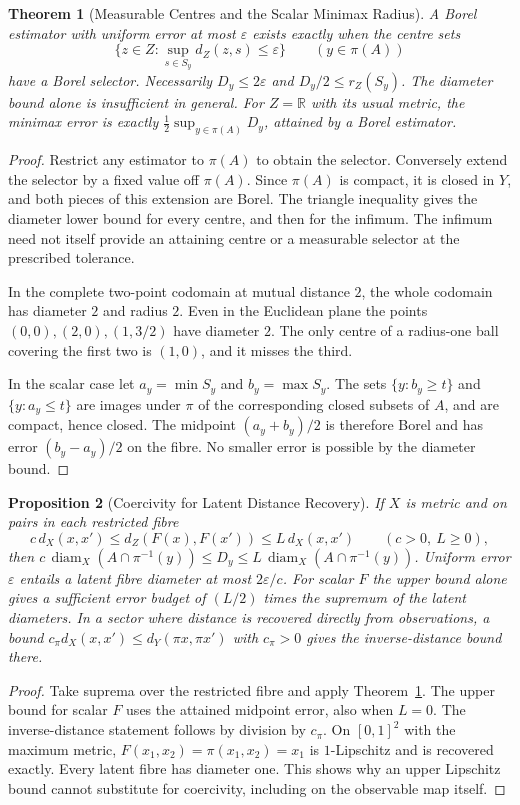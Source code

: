 \documentclass[11pt,a4paper]{article}
\newtheorem{theorem}{Theorem}[section]
\newtheorem{proposition}[theorem]{Proposition}
\theoremstyle{definition}
\begin{document}
\begin{theorem}[Measurable Centres and the Scalar Minimax Radius]\label{thm:measurable-fibre-centres}
A Borel estimator with uniform error at most $\varepsilon$ exists exactly when the centre sets
\[
 \{z\in Z:\sup_{s\in S_y}d_Z(z,s)\le\varepsilon\}
 \qquad (y\in\pi(A))
\]
have a Borel selector. Necessarily $D_y\le2\varepsilon$ and $D_y/2\le r_Z(S_y)$. The diameter bound alone is insufficient in general. For $Z=\mathbb R$ with its usual metric, the minimax error is exactly $\tfrac12\sup_{y\in\pi(A)}D_y$, attained by a Borel estimator.
\end{theorem}
\begin{proof}
Restrict any estimator to $\pi(A)$ to obtain the selector. Conversely extend the selector by a fixed value off $\pi(A)$. Since $\pi(A)$ is compact, it is closed in $Y$, and both pieces of this extension are Borel. The triangle inequality gives the diameter lower bound for every centre, and then for the infimum. The infimum need not itself provide an attaining centre or a measurable selector at the prescribed tolerance.

In the complete two-point codomain at mutual distance $2$, the whole codomain has diameter $2$ and radius $2$. Even in the Euclidean plane the points $(0,0),(2,0),(1,3/2)$ have diameter $2$. The only centre of a radius-one ball covering the first two is $(1,0)$, and it misses the third.

In the scalar case let $a_y=\min S_y$ and $b_y=\max S_y$. The sets $\{y:b_y\ge t\}$ and $\{y:a_y\le t\}$ are images under $\pi$ of the corresponding closed subsets of $A$, and are compact, hence closed. The midpoint $(a_y+b_y)/2$ is therefore Borel and has error $(b_y-a_y)/2$ on the fibre. No smaller error is possible by the diameter bound.
\end{proof}

\begin{proposition}[Coercivity for Latent Distance Recovery]\label{prop:projection-coercivity-bounds}
If $X$ is metric and on pairs in each restricted fibre
\[
 c\,d_X(x,x')\le d_Z(F(x),F(x'))\le L\,d_X(x,x')
 \qquad (c>0,\ L\ge0),
\]
then $c\,\operatorname{diam}_X(A\cap\pi^{-1}(y))\le D_y
\le L\,\operatorname{diam}_X(A\cap\pi^{-1}(y))$.
Uniform error $\varepsilon$ entails a latent fibre diameter at most $2\varepsilon/c$. For scalar $F$ the upper bound alone gives a sufficient error budget of $(L/2)$ times the supremum of the latent diameters. In a sector where distance is recovered directly from observations, a bound $c_\pi d_X(x,x')\le d_Y(\pi x,\pi x')$ with $c_\pi>0$ gives the inverse-distance bound there.
\end{proposition}
\begin{proof}
Take suprema over the restricted fibre and apply Theorem~\ref{thm:measurable-fibre-centres}. The upper bound for scalar $F$ uses the attained midpoint error, also when $L=0$. The inverse-distance statement follows by division by $c_\pi$. On $[0,1]^2$ with the maximum metric, $F(x_1,x_2)=\pi(x_1,x_2)=x_1$ is $1$-Lipschitz and is recovered exactly. Every latent fibre has diameter one. This shows why an upper Lipschitz bound cannot substitute for coercivity, including on the observable map itself.
\end{proof}
\end{document}
